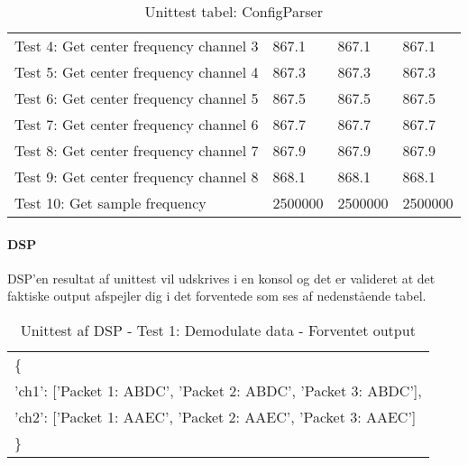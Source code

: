 \begin{appendices}
\begin{table}[H]
\begin{tabu}{ p{3 cm} p{3 cm} p{3 cm} p{3 cm}  }
		Test 4: Get center frequency channel 3 & 867.1 & 867.1 & 867.1 \\

		Test 5: Get center frequency channel 4 & 867.3 & 867.3 & 867.3 \\
		
		Test 6: Get center frequency channel 5 & 867.5 & 867.5 & 867.5 \\
		
		Test 7: Get center frequency channel 6 & 867.7 & 867.7 & 867.7 \\
		
		Test 8: Get center frequency channel 7  & 867.9 & 867.9 & 867.9 \\
		
		Test 9: Get center frequency channel 8  & 868.1 & 868.1 & 868.1 \\
		
		Test 10: Get sample frequency & 2500000 & 2500000 & 2500000 \\
		
	\end{tabu}
	\caption{Unittest tabel: ConfigParser}
	\label{tab:unittest_configparser}
\end{table}
\pagebreak

\paragraph{DSP}
DSP'en resultat af unittest vil udskrives i en konsol og det er valideret at det faktiske output afspejler dig i det forventede som ses af nedenstående tabel.
\begin{table}[H]
	\centering
	\begin{tabular}{l}
		\{ \\
		'ch1': ['Packet 1: ABDC', 'Packet 2: ABDC', 'Packet 3: ABDC'], \\
		'ch2': ['Packet 1: AAEC', 'Packet 2: AAEC', 'Packet 3: AAEC'] \\
		\} \\
	\end{tabular}
	\caption{Unittest af DSP - Test 1: Demodulate data - Forventet output}
	\label{unittest_DSP_test_1_forventet_otput}
\end{table}

\pagebreak

\end{appendices}
